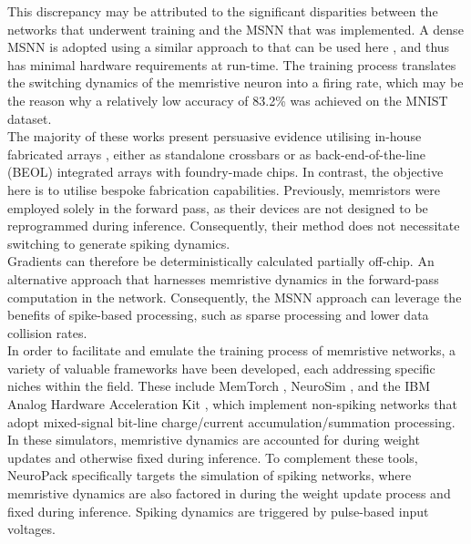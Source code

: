 \noindent This discrepancy may be attributed to the significant disparities between the networks that underwent training and the MSNN that was implemented. A dense MSNN is adopted using a similar approach to that can be used here \cite{duan2020spiking}, and thus has minimal hardware requirements at run-time. The training process translates the switching dynamics of the memristive neuron into a firing rate, which may be the reason why a relatively low accuracy of 83.2\% was achieved on the MNIST dataset. \\

\noindent The majority of these works present persuasive evidence utilising in-house fabricated arrays \cite{molter2016generalized}, either as standalone crossbars or as back-end-of-the-line (BEOL) integrated arrays with foundry-made chips. In contrast, the objective here is to utilise bespoke fabrication capabilities. Previously, memristors were employed solely in the forward pass, as their devices are not designed to be reprogrammed during inference. Consequently, their method does not necessitate switching to generate spiking dynamics.\\

\noindent Gradients can therefore be deterministically calculated partially off-chip. An alternative approach that harnesses memristive dynamics in the forward-pass computation in the network. Consequently, the MSNN approach can leverage the benefits of spike-based processing, such as sparse processing and lower data collision rates. \\

\noindent In order to facilitate and emulate the training process of memristive networks, a variety of valuable frameworks have been developed, each addressing specific niches within the field. These include MemTorch \cite{lammie2022memtorch}, NeuroSim \cite{chen2018neurosim}, and the IBM Analog Hardware Acceleration Kit \cite{rasch2021flexible}, which implement non-spiking networks that adopt mixed-signal bit-line charge/current accumulation/summation processing.\\ 

\noindent In these simulators, memristive dynamics are accounted for during weight updates and otherwise fixed during inference. To complement these tools, NeuroPack \cite{huang2022neuropack} specifically targets the simulation of spiking networks, where memristive dynamics are also factored in during the weight update process and fixed during inference. Spiking dynamics are triggered by pulse-based input voltages. \\

